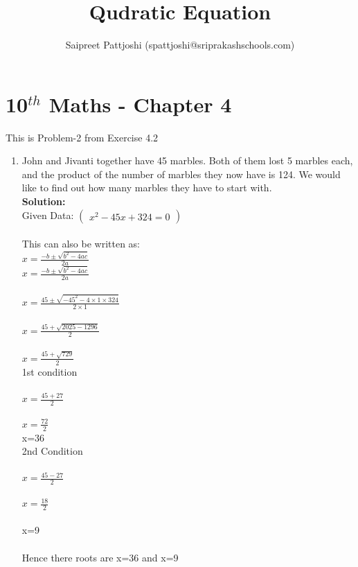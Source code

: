 \documentclass[12pt]{article}
\title{Qudratic Equation}
\author{Saipreet Pattjoshi (spattjoshi@sriprakashschools.com)}
\newcommand{\myvec}[1]{\ensuremath{\begin{pmatrix}#1\end{pmatrix}}}
\newcommand{\solution}{\noindent \textbf{Solution: }}
\begin{document}
\maketitle
\section*{10$^{th}$ Maths - Chapter 4}
This is Problem-2 from Exercise 4.2
\begin{enumerate}
\item John and Jivanti together have 45 marbles. Both of them lost 5 marbles each, and the product of the number of marbles they now have is 124. We would like to find out how many marbles they have to start with. \\
\solution \\
Given Data:
\myvec{x^2-45x+324=0}\\
\\This can also be written as:
\\${x=\frac{-b\pm\sqrt{b^2-4ac}}{2a}}$
\\$x=\frac{-b\pm\sqrt{b^2-4ac}}{2a}$\\
\\${x=\frac{45\pm\sqrt{-45^2-4 \times 1\times324}}{2 \times 1}}$\\
\\${x=\frac{45+\sqrt{2025-1296}}{2}}$\\
\\${x=\frac{45+\sqrt{729}}{2}}$
\\1st condition\\
\\${x=\frac{45+27}{2}}$\\
\\${x=\frac{72}{2}}$\\
x=36
\\2nd Condition\\
\\${x=\frac{45-27}{2}}$\\
\\${x=\frac{18}{2}}$\\
\\x=9\\
\\ Hence there roots are x=36 and x=9\\

	

\end{enumerate}
\end{document}
